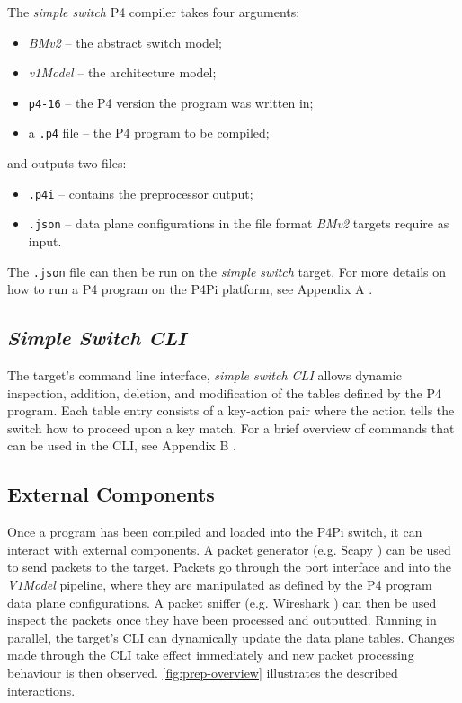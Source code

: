 The \textit{simple switch} P4 compiler takes four arguments:
\begin{itemize}[topsep=0pt]
\item \textit{BMv2} – the abstract switch model;
\item \textit{v1Model} – the architecture model;
\item \texttt{p4-16} – the P4 version the program was written in;
\item a \texttt{.p4} file – the P4 program to be compiled;
\end{itemize}

and outputs two files:
\begin{itemize}[topsep=0pt]
\item \texttt{.p4i} – contains the preprocessor output;
\item \texttt{.json} – data plane configurations in the file format \textit{BMv2} targets require as input.
\end{itemize}

The \texttt{.json} file can then be run on the \textit{simple switch} target. For more details on how to run a P4 program on the P4Pi platform, see Appendix A \cite{P4Pi}. 

\subsection{\textit{Simple Switch CLI}}
\label{sec:2.4.4}

The target's command line interface, \textit{simple switch CLI} allows dynamic inspection, addition, deletion, and modification of the tables defined by the P4 program. Each table entry consists of a key-action pair where the action tells the switch how to proceed upon a key match. For a brief overview of commands that can be used in the CLI, see Appendix B \cite{P4LangTutorial}.




\subsection{External Components}
\label{sec:2.4.5}

Once a program has been compiled and loaded into the P4Pi switch, it can interact with external components. A packet generator (e.g. Scapy \cite{Scapy}) can be used to send packets to the target. Packets go through the port interface and into the \textit{V1Model} pipeline, where they are manipulated as defined by the P4 program data plane configurations. A packet sniffer (e.g. Wireshark \cite{Wireshark}) can then be used inspect the packets once they have been processed and outputted. Running in parallel, the target's CLI can dynamically update the data plane tables. Changes made through the CLI take effect immediately and new packet processing behaviour is then observed. \cref{fig:prep-overview} illustrates the described interactions.

